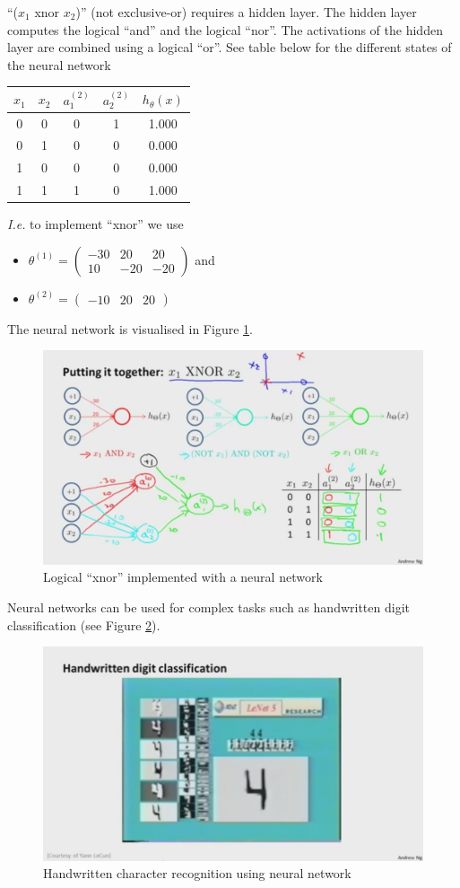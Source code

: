 \documentclass[a4paper,twoside,10pt]{article}
\begin{document}
``($x_1$ xnor $x_2$)'' (not exclusive-or) requires a hidden layer.
The hidden layer computes the logical ``and'' and the logical ``nor''.
The activations of the hidden layer are combined using a logical ``or''.
See table below for the different states of the neural network
\begin{center}
  \begin{tabular}{cccc|c}
    $x_1$ & $x_2$ & $a^{(2)}_1$ & $a^{(2)}_2$ & $h_\theta(x)$\\\hline
    0 & 0 & 0 & 1 & 1.000\\
    0 & 1 & 0 & 0 & 0.000\\
    1 & 0 & 0 & 0 & 0.000\\
    1 & 1 & 1 & 0 & 1.000\\
  \end{tabular}
\end{center}
\emph{I.e.} to implement ``xnor'' we use
\begin{itemize}
\item $\theta^{(1)}=\begin{pmatrix}-30&20&20\\10&-20&-20\end{pmatrix}$ and
\item $\theta^{(2)}=\begin{pmatrix}-10&20&20\end{pmatrix}$
\end{itemize}
The neural network is visualised in Figure \ref{fig:xnor}.
\begin{figure}[htbp]
  \begin{center}
    \includegraphics[width=.6\textwidth]{xnor}
    \caption{Logical ``xnor'' implemented with a neural network\citep{andrewng}\label{fig:xnor}}
  \end{center}
\end{figure}

Neural networks can be used for complex tasks such as handwritten digit classification\citep{lecun} (see Figure \ref{fig:lecun}).
\begin{figure}[htbp]
  \begin{center}
    \includegraphics[width=.6\textwidth]{lecun}
    \caption{Handwritten character recognition using neural network\citep{lecun}\label{fig:lecun}}
  \end{center}
\end{figure}
\end{document}
